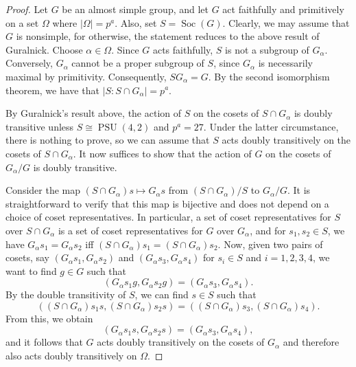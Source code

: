 \documentclass[10pt,a4paper]{amsart}
\DeclareMathOperator{\PSU}{PSU}
\DeclareMathOperator{\Soc}{Soc}
\begin{document}
\begin{proof}
	Let $G$ be an almost simple group, and let $G$ act faithfully and primitively on a set $\Omega$ where $|\Omega| = p^a$. Also, set $S = \Soc(G)$. Clearly, we may assume that $G$ is nonsimple, for otherwise, the statement reduces to the above result of Guralnick. Choose $\alpha \in \Omega$. Since $G$ acts faithfully, $S$ is not a subgroup of $G_\alpha$. Conversely, $G_\alpha$ cannot be a proper subgroup of $S$, since $G_\alpha$ is necessarily maximal by primitivity. Consequently, $SG_\alpha = G$. By the second isomorphism theorem, we have that \newline $|S:S\cap G_\alpha| = p^a$. 
	
	By Guralnick's result above, the action of $S$ on the cosets of $S \cap G_\alpha$ is doubly transitive unless $S \cong \PSU(4,2)$ and $p^a = 27$. Under the latter circumstance, there is nothing to prove, so we can assume that $S$ acts doubly transitively on the cosets of $S \cap G_\alpha$. It now suffices to show that the action of $G$ on the cosets of $G_\alpha/G$ is doubly transitive.
	
	Consider the map $(S \cap G_\alpha)s \longmapsto G_\alpha s$ from $(S \cap G_\alpha)/S$ to $G_\alpha/G$. It is straightforward to verify that this map is bijective and does not depend on a choice of coset representatives. In particular, a set of coset representatives for $S$ over $S \cap G_\alpha$ is a set of coset representatives for $G$ over $G_\alpha$, and for $s_1, s_2 \in S$, we have $G_\alpha s_1 = G_\alpha s_2$ iff $(S \cap G_\alpha)s_1 = (S \cap G_\alpha)s_2$.  Now, given two pairs of cosets, say $(G_\alpha s_1, G_\alpha s_2)$ and $(G_\alpha s_3, G_\alpha s_4)$ for $s_i \in S$ and $i=1, 2, 3, 4$, we want to find $g \in G$ such that 
	$$
		(G_\alpha s_1 g, G_\alpha s_2 g) = (G_\alpha s_3, G_\alpha s_4).
	$$
	By the double transitivity of $S$, we can find $s \in S$ such that
	$$
		((S \cap G_\alpha) s_1 s, (S \cap G_\alpha) s_2 s) = ((S \cap G_\alpha) s_3, (S \cap G_\alpha) s_4).
	$$
	From this, we obtain
	$$
		(G_\alpha s_1 s, G_\alpha s_2 s) = (G_\alpha s_3, G_\alpha s_4),
	$$
	and it follows that $G$ acts doubly transitively on the cosets of $G_\alpha$ and therefore also acts doubly transitively on $\Omega$.
\end{proof}
\end{document}
